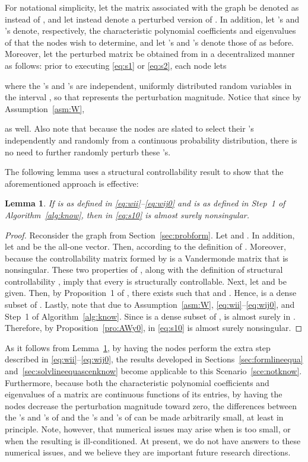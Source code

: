 \documentclass[11pt]{article}
\theoremstyle{plain}
\newtheorem{lemma}{Lemma}
\theoremstyle{definition}
\theoremstyle{remark}
\begin{document}
For notational simplicity, let the matrix associated with the graph  be denoted as  instead of , and let  instead denote a perturbed version of . In addition, let 's and 's denote, respectively, the characteristic polynomial coefficients and eigenvalues of  that the nodes wish to determine, and let 's and 's denote those of  as before. Moreover, let the perturbed matrix  be obtained from  in a decentralized manner as follows: prior to executing \eqref{eq:s1} or \eqref{eq:s2}, each node  lets

where the 's and 's are independent, uniformly distributed random variables in the interval , so that  represents the perturbation magnitude. Notice that since    by Assumption~\ref{asm:W},

as well. Also note that because the nodes are slated to select their 's independently and randomly from a continuous probability distribution, there is no need to further randomly perturb these 's.

The following lemma uses a structural controllability result to show that the aforementioned approach is effective:

\begin{lemma}\label{lem:randpert}
If  is as defined in \eqref{eq:wii}--\eqref{eq:wij0} and  is as defined in Step~1 of Algorithm~\ref{alg:know}, then  in \eqref{eq:s10} is almost surely nonsingular.
\end{lemma}

\begin{proof}
Reconsider the graph  from Section~\ref{sec:probform}. Let  and . In addition, let  and  be the all-one vector. Then,  according to the definition of . Moreover,  because the controllability matrix formed by  is a Vandermonde matrix that is nonsingular. These two properties of , along with the definition of structural controllability \cite{LinCT74}, imply that every  is structurally controllable. Next, let  and  be given. Then, by Proposition~1 of \cite{LinCT74}, there exists  such that  and . Hence,  is a dense subset of . Lastly, note that  due to Assumption~\ref{asm:W}, \eqref{eq:wii}--\eqref{eq:wij0}, and Step~1 of Algorithm~\ref{alg:know}. Since  is a dense subset of ,  is almost surely in . Therefore, by Proposition~\ref{pro:AWy0},  in \eqref{eq:s10} is almost surely nonsingular.
\end{proof}

As it follows from Lemma~\ref{lem:randpert}, by having the nodes perform the extra step described in \eqref{eq:wii}--\eqref{eq:wij0}, the results developed in Sections~\ref{sec:formlineequa} and~\ref{sec:solvlineequascenknow} become applicable to this Scenario~\ref{sce:notknow}. Furthermore, because both the characteristic polynomial coefficients and eigenvalues of a matrix are continuous functions of its entries, by having the nodes decrease the perturbation magnitude  toward zero, the differences between the 's and 's of  and the 's and 's of  can be made arbitrarily small, at least in principle. Note, however, that numerical issues may arise when  is too small, or when the resulting  is ill-conditioned. At present, we do not have answers to these numerical issues, and we believe they are important future research directions.
\end{document}
